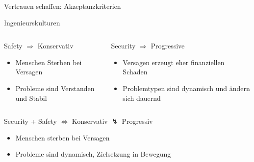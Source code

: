 \begin{frame}[T]{Vertrauen schaffen: Akzeptanzkriterien}

\end{frame}
\endgroup

\begin{frame}[T]{Ingenieurskulturen}
	\begin{columns}[t,fullwidth]
		\hfill
		\begin{column}{.45\linewidth}
			\begin{block}{Safety $\Longrightarrow$ Konservativ}
				\begin{itemize}
				\item Menschen Sterben bei Versagen
				\item Probleme sind Verstanden und Stabil
				\end{itemize}
			\end{block}
		\end{column}
		\begin{column}{.45\linewidth}
			\begin{block}{Security $\Longrightarrow$ Progressive}
				\begin{itemize}
				\item Versagen erzeugt eher finanziellen Schaden
				\item Problemtypen sind dynamisch und ändern sich dauernd
				\end{itemize}
			\end{block}
		\end{column}
		\hfill
	\end{columns}

    \begin{block}{Security + Safety $\Longleftrightarrow$ Konservativ $\lightning$ Progressiv}
	    \begin{itemize}
	      \item Menschen sterben bei Versagen
	      \item Probleme sind dynamisch, Zielsetzung in Bewegung
	    \end{itemize}
  	\end{block}
\end{frame}


